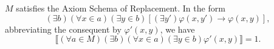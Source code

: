 $M$ satisfies the Axiom Schema of Replacement. In the form
$$(\exists b)(\forall x \in a)(\exists y \in b)[(\exists y')\varphi(x, y') \to \varphi(x, y)],$$
abbreviating the consequent by $\varphi'(x, y)$, we have
$$\llbracket (\forall a \in M)(\exists b)(\forall x \in a)(\exists y \in b)\varphi'(x, y) \rrbracket = 1.$$
